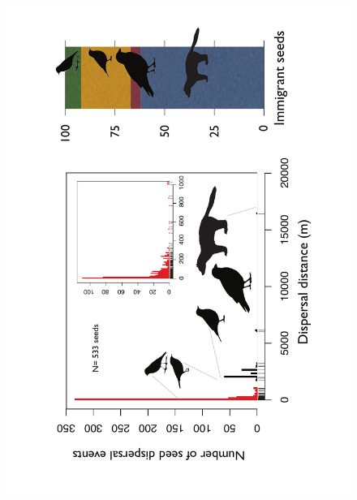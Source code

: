 \documentclass[a4paper, 12pt]{article}
\begin{document}
\begin{linenumbers}
\newpage 
\pagestyle{empty}
\begin{figure}[htbp]
\centerline{\includegraphics[height=26cm]{Fig3.pdf}}
%
\end{figure}


\end{linenumbers}
\end{document}
